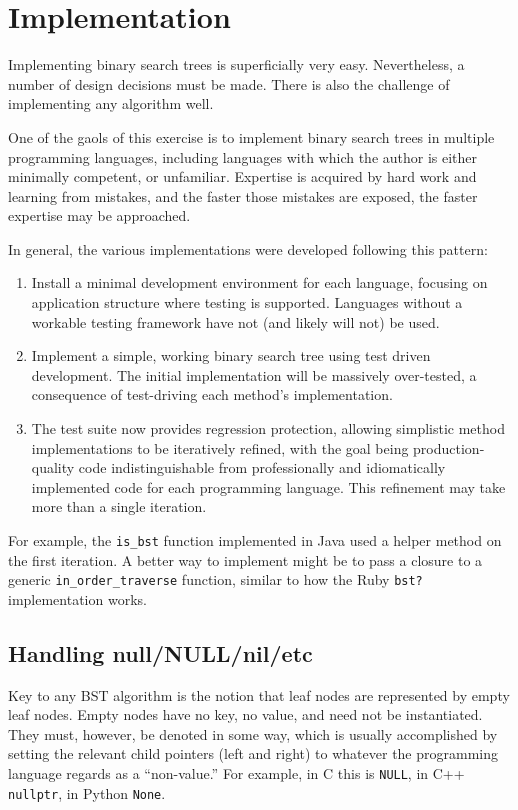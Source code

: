 \documentclass{article}
\begin{document}
\appendix

\section{Implementation}

Implementing binary search trees is superficially very easy. Nevertheless,
a number of design decisions must be made. There is also the challenge of
implementing any algorithm well.

One of the gaols of this exercise is to implement binary search trees in multiple
programming languages, including languages with which the author is either
minimally competent, or unfamiliar. Expertise is acquired by hard work and
learning from mistakes, and the faster those mistakes are exposed, the
faster expertise may be approached.

In general, the various implementations were developed following this
pattern:

\begin{enumerate}
\item Install a minimal development environment for each language, focusing on
application structure where testing is supported. Languages without a workable
testing framework have not (and likely will not) be used.
\item Implement a simple, working binary search tree using test driven development.
The initial implementation will be massively over-tested, a consequence of
test-driving each method's implementation.
\item The test suite now provides regression protection, allowing simplistic
method implementations to be iteratively refined, with the goal being production-quality
code indistinguishable from professionally and idiomatically implemented code
for each programming language. This refinement may take more than a single iteration.
\end{enumerate}

For example, the {\tt is\_bst} function implemented in Java used a helper
method on the first iteration. A better way to implement might be to pass
a closure to a generic {\tt in\_order\_traverse} function, similar to how
the Ruby {\tt bst?} implementation works.

\subsection{Handling null/NULL/nil/etc}

Key to any BST algorithm is the notion that leaf nodes are represented
by empty leaf nodes. Empty nodes have no key, no value, and need not be
instantiated. They must, however, be denoted in some way, which is
usually accomplished by setting the relevant child pointers (left and
right) to whatever the programming language regards as a ``non-value.''
For example, in C this is {\tt NULL}, in C++ {\tt nullptr}, in Python {\tt None}.
\end{document}
